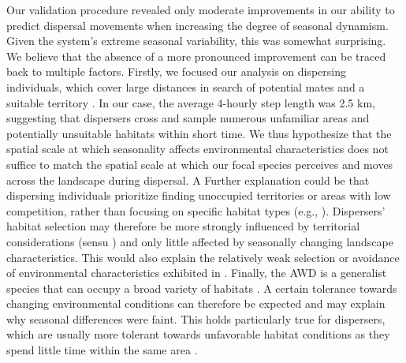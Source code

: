 \documentclass[../FinalThesis.tex]{subfiles}
\begin{document}
Our validation procedure revealed only moderate improvements in our ability to
predict dispersal movements when increasing the degree of seasonal dynamism.
Given the system's extreme seasonal variability, this was somewhat surprising.
We believe that the absence of a more pronounced improvement can be traced back
to multiple factors. Firstly, we focused our analysis on dispersing individuals,
which cover large distances in search of potential mates and a suitable
territory \citep{McNutt.1996, Cozzi.2020}. In our case, the average 4-hourly
step length was 2.5 km, suggesting that dispersers cross and sample numerous
unfamiliar areas and potentially unsuitable habitats within short time. We thus
hypothesize that the spatial scale at which seasonality affects environmental
characteristics does not suffice to match the spatial scale at which our focal
species perceives and moves across the landscape during dispersal. A Further
explanation could be that dispersing individuals prioritize finding unoccupied
territories or areas with low competition, rather than focusing on specific
habitat types (e.g., \citealp{Creel.1996, Creel.2001}). Dispersers' habitat
selection may therefore be more strongly influenced by territorial
considerations (sensu \citealp{Cozzi.2018}) and only little affected by
seasonally changing landscape characteristics. This would also explain the
relatively weak selection or avoidance of environmental characteristics
exhibited in . Finally, the AWD is a generalist species
that can occupy a broad variety of habitats \citep{Woodroffe.2011}. A certain
tolerance towards changing environmental conditions can therefore be expected
and may explain why seasonal differences were faint. This holds particularly
true for dispersers, which are usually more tolerant towards unfavorable habitat
conditions as they spend little time within the same area \citep{ONeill.2020}.

\end{document}
